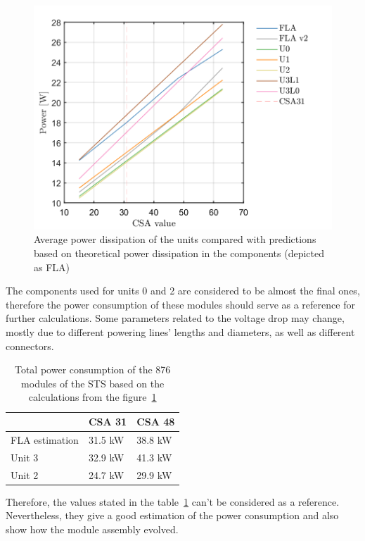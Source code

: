 \begin{figure}[h!]
\centering
\includegraphics[width=0.65\columnwidth]{Chapter6/DCS/images/theor.png}
\caption{Average power dissipation of the units compared with predictions based on theoretical power dissipation in the components (depicted as FLA)} 
\label{fig_theor}
\end{figure}
The components used for units 0 and 2 are considered to be almost the final ones, therefore the power consumption of these modules should serve as a reference for further calculations. Some parameters related to the voltage drop may change, mostly due to different powering lines' lengths and diameters, as well as different connectors. 
\begin{table}[h!]
\centering
\begin{tabular}{lll}
\hline
               & \gls{CSA} 31  & \gls{CSA} 48  \\ \hline
FLA estimation & 31.5 kW & 38.8 kW \\
Unit 3         & 32.9 kW & 41.3 kW \\
Unit 2         & 24.7 kW & 29.9 kW \\ \hline
\end{tabular}
\caption{Total power consumption of the 876 modules of the \gls{STS} based on the calculations from the figure~\ref{fig_theor}}
\label{tab:power_cons}
\end{table}
Therefore, the values stated in the table~\ref{tab:power_cons} can't be considered as a reference. Nevertheless, they give a good estimation of the power consumption and also show how the module assembly evolved. 
